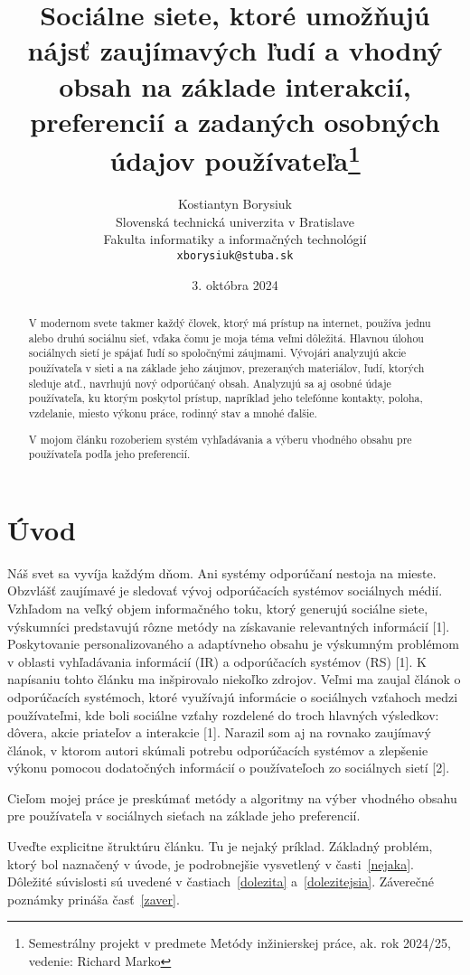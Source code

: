 \documentclass[10pt,twoside,slovak,a4paper]{article}
\title{Sociálne siete, ktoré umožňujú nájsť zaujímavých ľudí a vhodný obsah na základe interakcií, preferencií a zadaných osobných údajov používateľa\thanks{Semestrálny projekt v predmete Metódy inžinierskej práce, ak. rok 2024/25, vedenie: Richard Marko}} %
\author{Kostiantyn Borysiuk\\[2pt]
	{\small Slovenská technická univerzita v Bratislave}\\
	{\small Fakulta informatiky a informačných technológií}\\
	{\small \texttt{xborysiuk@stuba.sk}}
	}
\date{\small 3. októbra 2024} %
\begin{document}
\maketitle

\begin{abstract}
V modernom svete takmer každý človek, ktorý má prístup na internet, používa jednu alebo druhú sociálnu sieť, vďaka čomu je moja téma veľmi dôležitá. Hlavnou úlohou sociálnych sietí je spájať ľudí so spoločnými záujmami.
Vývojári analyzujú akcie používateľa v sieti a na základe jeho záujmov, prezeraných materiálov, ľudí, ktorých sleduje atď., navrhujú nový odporúčaný obsah. Analyzujú sa aj osobné údaje používateľa, ku ktorým poskytol prístup, napríklad jeho telefónne kontakty, poloha, vzdelanie, miesto výkonu práce, rodinný stav a mnohé ďalšie.

V mojom článku rozoberiem systém vyhľadávania a výberu vhodného obsahu pre používateľa podľa jeho preferencií.
\end{abstract}



\section{Úvod}
Náš svet sa vyvíja každým dňom. Ani systémy odporúčaní nestoja na mieste. Obzvlášť zaujímavé je sledovať vývoj odporúčacích systémov sociálnych médií. Vzhľadom na veľký objem informačného toku, ktorý generujú sociálne siete, výskumníci predstavujú rôzne metódy na získavanie relevantných informácií [1]. Poskytovanie personalizovaného a adaptívneho obsahu je výskumným problémom v oblasti vyhľadávania informácií (IR) a odporúčacích systémov (RS) [1]. K napísaniu tohto článku ma inšpirovalo niekoľko zdrojov. Veľmi ma zaujal článok o odporúčacích systémoch, ktoré využívajú informácie o sociálnych
vzťahoch medzi používateľmi, kde boli sociálne vzťahy rozdelené do troch hlavných výsledkov: dôvera, akcie priateľov a interakcie [1]. Narazil som aj na rovnako zaujímavý článok, v ktorom autori skúmali potrebu odporúčacích systémov a zlepšenie výkonu pomocou dodatočných informácií o používateľoch zo sociálnych sietí [2].

Cieľom mojej práce je preskúmať metódy a algoritmy na výber vhodného obsahu pre používateľa v sociálnych sieťach na základe jeho preferencií.

Uveďte explicitne štruktúru článku. Tu je nejaký príklad.
Základný problém, ktorý bol naznačený v úvode, je podrobnejšie vysvetlený v časti~\ref{nejaka}.
Dôležité súvislosti sú uvedené v častiach~\ref{dolezita} a~\ref{dolezitejsia}.
Záverečné poznámky prináša časť~\ref{zaver}.
\end{document}
